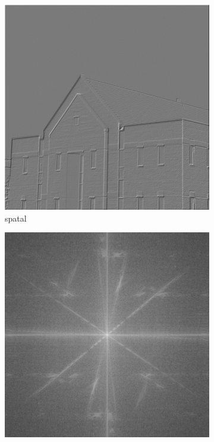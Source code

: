 \documentclass[
	12pt, %
]{style/fphw}
\begin{document}
\begin{figure}[H]
     \centering
     \begin{subfigure}[b]{0.45\textwidth}
         \centering
         \includegraphics[width=\textwidth]{plots2/Q5_1_spatial.png}
         \caption{spatal}
         \label{Q5_1_spatial.png}
     \end{subfigure}
     \hfill
         \begin{subfigure}[b]{0.45\textwidth}
         \centering
         \includegraphics[width=\textwidth]{plots2/Q5_1_spectrum.png}

\end{subfigure}
\end{figure}
\end{document}
